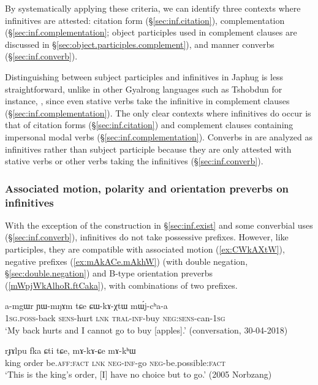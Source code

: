 By systematically applying these criteria, we can identify three contexts where infinitives are attested: citation form (§\ref{sec:inf.citation}), complementation (§\ref{sec:inf.complementation}; object participles used in complement clauses are discussed in §\ref{sec:object.participles.complement}), and manner converbs (§\ref{sec:inf.converb}). 

Distinguishing between subject participles and  infinitives in Japhug is less straightforward, unlike in other Gyalrong languages such as Tshobdun for instance, \citealt{jackson14morpho}, since even stative verbs take the  infinitive in complement clauses (§\ref{sec:inf.complementation}). The only clear contexts where  infinitives do occur is that of citation forms (§\ref{sec:inf.citation}) and complement clauses containing impersonal modal verbs (§\ref{sec:inf.complementation}). Converbs in  are analyzed as infinitives rather than subject participle because they are only attested with stative verbs or other verbs taking the  infinitives (§\ref{sec:inf.converb}).

\subsubsection{Associated motion, polarity and orientation preverbs on infinitives}  \label{sec:infinitives.other.prefixes}
With the exception of the construction in §\ref{sec:inf.exist} and some converbial uses (§\ref{sec:inf.converb}),  infinitives do not take possessive prefixes. However, like participles, they are compatible with associated motion (\ref{ex:CWkAXtW}), negative prefixes (\ref{ex:mAkACe.mAkhW}) (with double negation, §\ref{sec:double.negation}) and B-type orientation preverbs (\ref{mWpjWkAlhoR.ftCaka}), with combinations of two prefixes.

\begin{exe}
\ex \label{ex:CWkAXtW}
\gll a-mgɯr ɲɯ-mŋɤm tɕe ɕɯ-kɤ-χtɯ mɯ́j-cʰa-a \\
\textsc{1sg}.\textsc{poss}-back \textsc{sens}-hurt \textsc{lnk} \textsc{tral}-\textsc{inf}-buy \textsc{neg}:\textsc{sens}-can-\textsc{1sg} \\
\glt `My back hurts and I cannot go to  buy [apples].' (conversation, 30-04-2018)
\end{exe}
 
\begin{exe}
\ex \label{ex:mAkACe.mAkhW}
\gll   rɟɤlpu fka ɕti tɕe, mɤ-kɤ-ɕe mɤ-kʰɯ \\
king order be.\textsc{aff}:\textsc{fact} \textsc{lnk} \textsc{neg}-\textsc{inf}-go \textsc{neg}-be.possible:\textsc{fact} \\
\glt `This is the king's order, [I] have no choice but to go.' (2005 Norbzang)
\end{exe}
 
